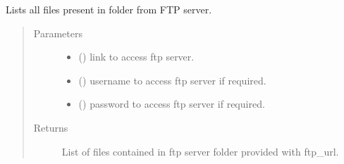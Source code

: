 \documentclass[letterpaper,10pt,english]{sphinxmanual}
\begin{document}
\begin{fulllineitems}
\label{\detokenize{_autosummary/graphdb_builder:graphdb_builder.builder_utils.list_ftp_directory}}
Lists all files present in folder from FTP server.
\begin{quote}\begin{description}
\item[{Parameters}] \leavevmode\begin{itemize}
\item {} 
 () \textendash{} link to access ftp server.

\item {} 
 () \textendash{} username to access ftp server if required.

\item {} 
 () \textendash{} password to access ftp server if required.

\end{itemize}

\item[{Returns}] \leavevmode
List of files contained in ftp server folder provided with ftp\_url.

\end{description}\end{quote}

\end{fulllineitems}

\end{document}

